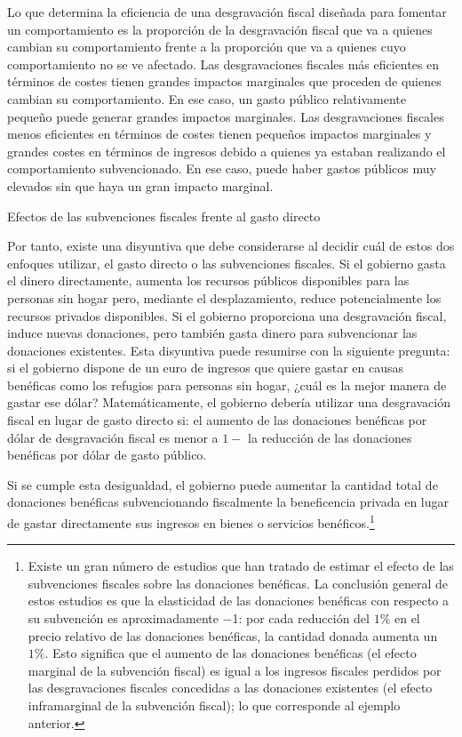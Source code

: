 \documentclass[10pt,a4paper]{article}
\begin{document}
Lo que determina la eficiencia de una desgravación fiscal diseñada para fomentar un comportamiento es la proporción de la desgravación fiscal que va a quienes cambian su comportamiento frente a la proporción que va a quienes cuyo comportamiento no se ve afectado. Las desgravaciones fiscales más eficientes en términos de costes tienen grandes impactos marginales que proceden de quienes cambian su comportamiento. En ese caso, un gasto público relativamente pequeño puede generar grandes impactos marginales. Las desgravaciones fiscales menos eficientes en términos de costes tienen pequeños impactos marginales y grandes costes en términos de ingresos debido a quienes ya estaban realizando el comportamiento subvencionado. En ese caso, puede haber gastos públicos muy elevados sin que haya un gran impacto marginal.

Efectos de las subvenciones fiscales frente al gasto directo 

Por tanto, existe una disyuntiva que debe considerarse al decidir cuál de estos dos enfoques utilizar, el gasto directo o las subvenciones fiscales. Si el gobierno gasta el dinero directamente, aumenta los recursos públicos disponibles para las personas sin hogar pero, mediante el desplazamiento, reduce potencialmente los recursos privados disponibles. Si el gobierno proporciona una desgravación fiscal, induce nuevas donaciones, pero también gasta dinero para subvencionar las donaciones existentes. Esta disyuntiva puede resumirse con la siguiente pregunta: si el gobierno dispone de un euro de ingresos que quiere gastar en causas benéficas como los refugios para personas sin hogar, ¿cuál es la mejor manera de gastar ese dólar? Matemáticamente, el gobierno debería utilizar una desgravación fiscal en lugar de gasto directo si: el aumento de las donaciones benéficas por dólar de desgravación fiscal es menor a $1 -$ la reducción de las donaciones benéficas por dólar de gasto público.

Si se cumple esta desigualdad, el gobierno puede aumentar la cantidad total de donaciones benéficas subvencionando fiscalmente la beneficencia privada en lugar de gastar directamente sus ingresos en bienes o servicios benéficos.\footnote{%
    Existe un gran número de estudios que han tratado de estimar el efecto de las subvenciones fiscales sobre las donaciones benéficas. La conclusión general de estos estudios es que la elasticidad de las donaciones benéficas con respecto a su subvención es aproximadamente −1: por cada reducción del $1\%$ en el precio relativo de las donaciones benéficas, la cantidad donada aumenta un $1\%$. Esto significa que el aumento de las donaciones benéficas (el efecto marginal de la subvención fiscal) es igual a los ingresos fiscales perdidos por las desgravaciones fiscales concedidas a las donaciones existentes (el efecto inframarginal de la subvención fiscal); lo que corresponde al ejemplo anterior.
}
\end{document}
